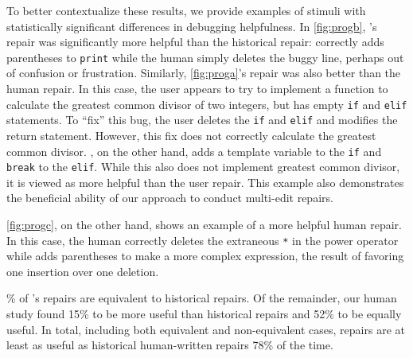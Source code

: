 To better contextualize these results, we provide examples of stimuli with
statistically significant differences in debugging helpfulness. In
\autoref{fig:progb}, \toolname's repair was significantly more helpful than the
historical repair: \toolname correctly adds parentheses to \texttt{print} while
the human simply deletes the buggy line, perhaps out of confusion or
frustration. Similarly, \autoref{fig:proga}'s \toolname repair was also better
than the human repair. In this case, the user appears to try to implement a
function to calculate the greatest common divisor of two integers, but has empty
\texttt{if} and \texttt{elif} statements. To ``fix'' this bug, the user deletes
the \texttt{if} and \texttt{elif} and modifies the return statement. However,
this fix does not correctly calculate the greatest common divisor. \toolname, on
the other hand, adds a template variable to the \texttt{if} and \texttt{break}
to the \texttt{elif}. While this also does not implement greatest common
divisor, it is viewed as more helpful than the user repair. This example also
demonstrates the beneficial ability of our approach to conduct multi-edit
repairs.

\autoref{fig:progc}, on the other hand, shows an example of a more helpful human
repair. In this case, the human correctly deletes the extraneous \texttt{*} in
the power operator while \toolname adds parentheses to make a more complex
expression, the result of favoring one insertion over one deletion.

\begin{framed}
  \% of \toolname's repairs are equivalent to historical repairs.
  Of the remainder, our human study found 15\% to be more useful than
  historical repairs and 52\% to be equally useful. In total, including
  both equivalent and non-equivalent cases, \toolname repairs are at
  least as useful as historical human-written repairs 78\% of the time.

\end{framed}

